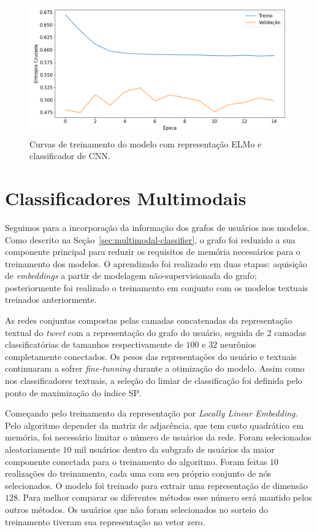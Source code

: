 \begin{figure}[h!]
\begin{center} {
    \begin{center}
    \includegraphics[scale=0.45]{images/elmo_cnn_train.png}
    \caption{Curvas de treinamento do modelo com representação ELMo e classificador de CNN.}
    \label{fig:elmo_train}
    \end{center}
}
\end{center}
\end{figure}

\section{Classificadores Multimodais}

Seguimos para a incorporação da informação dos grafos de usuários nos modelos.
Como descrito na Seção~\ref{sec:multimodal-classifier}, o grafo foi reduzido a
sua componente principal para reduzir os requisitos de memória necessários para
o treinamento dos modelos.
O aprendizado foi realizado em duas etapas: aquisição de \textit{embeddings} a
partir de modelagem não-supervisionada do grafo; posteriormente foi realizado o
treinamento em conjunto com os modelos textuais treinados anteriormente.

As redes conjuntas compostas pelas camadas concatenadas da representação textual
do \textit{tweet} com a representação do grafo do usuário, seguida de 2 camadas
classificatórias de tamanhos respectivamente de $100$ e $32$ neurônios completamente
conectados.
Os pesos das representações do usuário e textuais continuaram a sofrer
\textit{fine-tunning} durante a otimização do modelo.
Assim como nos classificadores textuais, a seleção do limiar de
classificação foi definida pelo ponto de maximização do índice SP.

Começando pelo treinamento da representação por \textit{Locally Linear Embedding}.
Pelo algoritmo depender da matriz de adjacência, que tem custo quadrático em
memória, foi necessário limitar o número de usuários da rede.
Foram selecionados aleatoriamente $10$ mil usuários dentro da subgrafo de
usuários da maior componente conectada para o treinamento do algoritmo.
Foram feitas $10$ realizações do treinamento, cada uma com seu próprio conjunto
de nós selecionados.
O modelo foi treinado para extrair uma representação de dimensão $128$.
Para melhor comparar os diferentes métodos esse número será mantido pelos outros
métodos.
Os usuários que não foram selecionados no sorteio do treinamento tiveram sua
representação no vetor zero.

